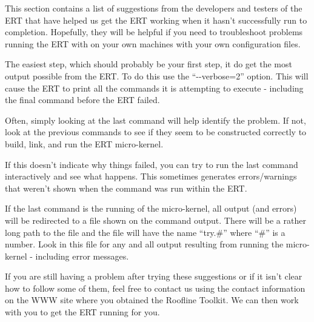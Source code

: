 This section contains a list of suggestions from the developers and testers
of the ERT that have helped us get the ERT working when it hasn't
successfully run to completion.  Hopefully, they will be helpful if you need
to troubleshoot problems running the ERT with on your own machines with your 
own configuration files.

The easiest step, which should probably be your first step, it do get the most
output possible from the ERT.  To do this use the ``-{}-verbose=2'' option.
This will cause the ERT to print all the commands it is attempting to execute -
including the final command before the ERT failed.

Often, simply looking at the last command will help identify the problem.  If
not, look at the previous commands to see if they seem to be constructed
correctly to build, link, and run the ERT micro-kernel.

If this doesn't indicate why things failed, you can try to run the last
command interactively and see what happens.  This sometimes generates
errors/warnings that weren't shown when the command was run within the ERT.

If the last command is the running of the micro-kernel, all output (and
errors) will be redirected to a file shown on the command output.  There will
be a rather long path to the file and the file will have the name ``try.\#''
where ``\#'' is a number.  Look in this file for any and all output resulting
from running the micro-kernel - including error messages.

If you are still having a problem after trying these suggestions or if it
isn't clear how to follow some of them, feel free to contact us using the
contact information on the WWW site where you obtained the Roofline Toolkit.
We can then work with you to get the ERT running for you.
